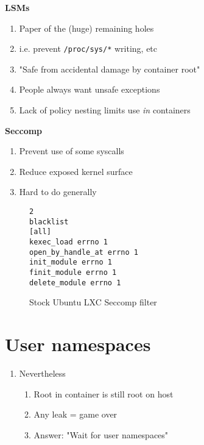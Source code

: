 \documentclass{beamer}
\begin{document}
\begin{frame}
\textbf{LSMs}
\begin{enumerate}
\item Paper of the (huge) remaining holes
\item i.e. prevent {\tt /proc/sys/*} writing, etc
\item "Safe from accidental damage by container root"
\item People always want unsafe exceptions
\item Lack of policy nesting limits use {\em in} containers
\end{enumerate}

\vspace{0.25in}

\textbf{Seccomp}
\begin{enumerate}
\item Prevent use of some syscalls
\item Reduce exposed kernel surface
\item Hard to do generally
\end{enumerate}
\end{frame}

\begin{frame}[fragile]
\begin{center}
\begin{figure}
\begin{minipage}{0.5\linewidth}
\begin{verbatim}
2
blacklist
[all]
kexec_load errno 1
open_by_handle_at errno 1
init_module errno 1
finit_module errno 1
delete_module errno 1
\end{verbatim}
\end{minipage}
\caption{Stock Ubuntu LXC Seccomp filter}
\end{figure}
\end{center}
\end{frame}

\section{User namespaces}
\begin{frame}
\begin{enumerate}
\item Nevertheless
	\begin{enumerate}
	\item Root in container is still root on host
	\item Any leak = game over
	\item Answer: "Wait for user namespaces"
	\end{enumerate}
\end{enumerate}
\end{frame}
\end{document}
